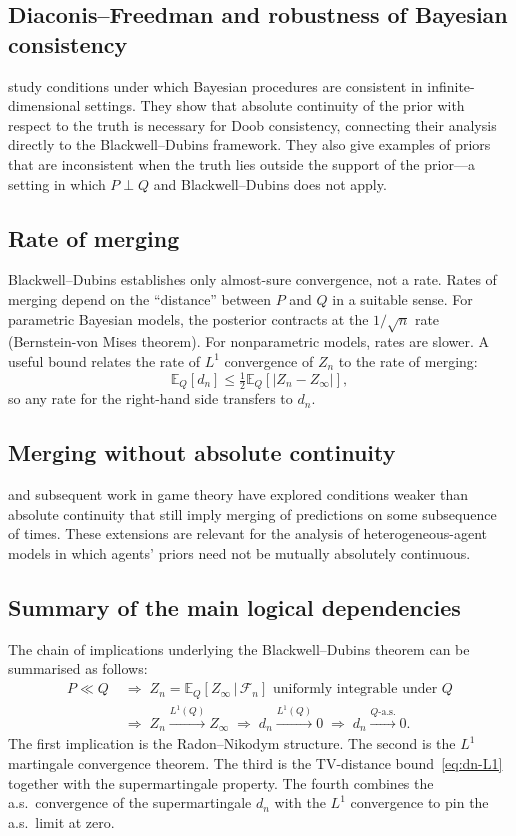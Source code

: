\documentclass[12pt]{article}
\newcommand{\E}{\mathbb{E}}
\begin{document}
\subsection{Diaconis--Freedman and robustness of Bayesian consistency}

\citet{diaconis1986} study conditions under which Bayesian procedures are
consistent in infinite-dimensional settings.  They show that absolute
continuity of the prior with respect to the truth is necessary for Doob
consistency, connecting their analysis directly to the Blackwell--Dubins
framework.  They also give examples of priors that are inconsistent when the
truth lies outside the support of the prior---a setting in which $P \perp Q$
and Blackwell--Dubins does not apply.

\subsection{Rate of merging}

Blackwell--Dubins establishes only almost-sure convergence, not a rate.
Rates of merging depend on the ``distance'' between $P$ and $Q$ in a suitable
sense.  For parametric Bayesian models, the posterior contracts at the
$1/\sqrt{n}$ rate (Bernstein-von Mises theorem).  For nonparametric models,
rates are slower.  A useful bound relates the rate of $L^1$ convergence of
$Z_n$ to the rate of merging:
\[
\E_Q[d_n] \leq \tfrac{1}{2}\E_Q[|Z_n - Z_\infty|],
\]
so any rate for the right-hand side transfers to $d_n$.

\subsection{Merging without absolute continuity}

\citet{lehrer1996} and subsequent work in game theory have explored
conditions weaker than absolute continuity that still imply merging of
predictions on some subsequence of times.  These extensions are relevant for
the analysis of heterogeneous-agent models in which agents' priors need not
be mutually absolutely continuous.

\subsection{Summary of the main logical dependencies}

The chain of implications underlying the Blackwell--Dubins theorem can be
summarised as follows:
\begin{align*}
P \ll Q
\;&\Longrightarrow\;
Z_n = \mathbb{E}_Q[Z_\infty\,|\,\mathscr{F}_n] \text{ uniformly integrable under } Q \\
\;&\Longrightarrow\;
Z_n \xrightarrow{L^1(Q)} Z_\infty
\;\Longrightarrow\;
d_n \xrightarrow{L^1(Q)} 0
\;\Longrightarrow\;
d_n \xrightarrow{Q\text{-a.s.}} 0.
\end{align*}
The first implication is the Radon--Nikodym structure.  The second is
the $L^1$ martingale convergence theorem.  The third is the TV-distance
bound~\eqref{eq:dn-L1} together with the supermartingale property.  The
fourth combines the a.s.\ convergence of the supermartingale $d_n$ with the
$L^1$ convergence to pin the a.s.\ limit at zero.

\bigskip


\end{document}
